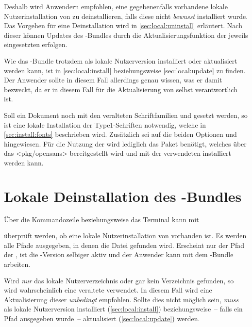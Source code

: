 Deshalb wird Anwendern empfohlen, eine gegebenenfalls vorhandene lokale 
Nutzerinstallation von \TUDScript zu deinstallieren, falls diese nicht 
\emph{bewusst} installiert wurde. Das Vorgehen für eine Deinstallation wird in 
\autoref{sec:local:uninstall} erläutert. Nach dieser können Updates des 
\TUDScript-Bundles durch die Aktualisierungsfunktion der jeweils eingesetzten 
\Distro erfolgen. 

Wie das \TUDScript-Bundle trotzdem als lokale Nutzerversion installiert oder 
aktualisiert werden kann, ist in \autoref{sec:local:install} beziehungsweise 
\autoref{sec:local:update} zu finden. Der Anwender sollte in diesem Fall 
allerdings genau wissen, was er damit bezweckt, da er in diesem Fall für die 
Aktualisierung von \TUDScript selbst verantwortlich ist.



%
Soll ein Dokument noch mit den veralteten Schriftfamilien \Univers und \DIN 
gesetzt werden, so ist eine lokale Installation der Type1-Schriften notwendig, 
welche in \autoref{sec:install:fonts} beschrieben wird. Zusätzlich sei auf die 
beiden Optionen  und  hingewiesen. 
Für die Nutzung der \OpenSans wird lediglich das Paket  
benötigt, welches über das \CTAN<pkg/opensans> bereitgestellt wird und mit der 
verwendeten \Distro installiert werden kann.



\section{%
  Lokale Deinstallation des \TUDScript-Bundles%
  \label{sec:local:uninstall}%
}

Über die Kommandozeile beziehungsweise das Terminal kann mit
%
\begin{quoting}
\RET
\end{quoting}
%
überprüft werden, ob eine lokale Nutzerinstallation von \TUDScript vorhanden 
ist. Es werden alle Pfade ausgegeben, in denen die Datei  
gefunden wird. Erscheint nur der Pfad der \Distro, ist die 
\TUDScript-Version selbiger aktiv und der Anwender kann mit dem 
\TUDScript-Bundle arbeiten.

Wird \emph{nur} das lokale Nutzerverzeichnis oder gar kein Verzeichnis 
gefunden, so wird wahrscheinlich eine veraltete \Distro 
verwendet. In diesem Fall wird eine Aktualisierung dieser \emph{unbedingt} 
empfohlen. Sollte dies nicht möglich sein, \emph{muss} \TUDScript als lokale 
Nutzerversion installiert (\autoref{sec:local:install}) beziehungsweise~-- 
falls ein Pfad ausgegeben wurde~-- aktualisiert (\autoref{sec:local:update}) 
werden.

